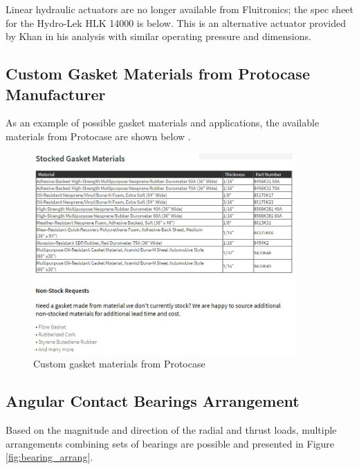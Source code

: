 Linear hydraulic actuators are no longer available from Fluitronics; the spec sheet for the Hydro-Lek HLK 14000 is below.
This is an alternative actuator provided by Khan in his analysis \cite{khan_development_2015} with similar operating pressure and dimensions.




\subsection{Custom Gasket Materials from Protocase Manufacturer} \label{app:gaskets}

As an example of possible gasket materials and applications, the available materials from Protocase are shown below \cite{protocase_custom_nodate}.

\begin{figure}[H]
    \centering
    \includegraphics[width=0.9\textwidth]{Sections/Appendices/Appendix_Gasket.JPG}
    \caption{Custom gasket materials from Protocase \cite{protocase_custom_nodate}}
    \label{fig:appendix_gasket}
\end{figure}

\subsection{Angular Contact Bearings Arrangement} \label{app:bearings}

Based on the magnitude and direction of the radial and thrust loads, multiple arrangements combining sets of bearings are possible and presented in Figure \ref{fig:bearing_arrang}.

